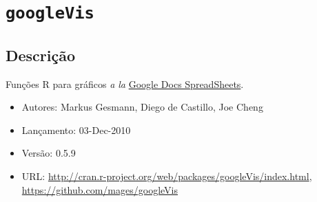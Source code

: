 \section{\texttt{googleVis}}


\subsection{Descrição}

\begin{frame}

  Funções R para gráficos \textit{a la}
  \href{https://developers.google.com/chart/interactive/docs/gallery}{
    Google Docs SpreadSheets}.  \vspace{2em}

  \begin{itemize}
  \item Autores: Markus Gesmann, Diego de Castillo, Joe Cheng
  \item Lançamento: 03-Dec-2010
  \item Versão: 0.5.9
  \item URL:
    \url{http://cran.r-project.org/web/packages/googleVis/index.html},
    \url{https://github.com/mages/googleVis}
  \end{itemize}
  
\end{frame}

